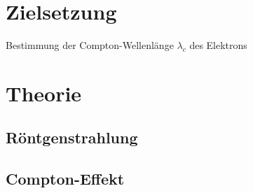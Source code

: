 \section*{Zielsetzung}
Bestimmung der Compton-Wellenlänge $\lambda_c$ des Elektrons
\section{Theorie}
\label{sec:Theorie}
\subsection{Röntgenstrahlung}
\cite{603}
\subsection{Compton-Effekt}